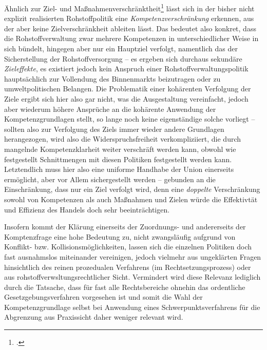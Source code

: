 \documentclass[12pt,a4paper,oneside]{book} %
\begin{document}
	Ähnlich zur \glqq Ziel- und Maßnahmenverschränktheit\grqq \footcite[siehe zu diesem Begriff]{Callies, Berliner Online Beiträge zum Europarecht, Nr 52} lässt sich in der bisher nicht explizit realisierten Rohstoffpolitik eine \textit{Kompetenzverschränkung} erkennen, aus der aber keine Zielverschränkheit ableiten lässt. Das bedeutet also konkret, dass die Rohstoffverwaltung zwar mehrere Kompetenzen in unterschiedlicher Weise in sich bündelt, hingegen aber nur ein Hauptziel verfolgt, namentlich das der Sicherstellung der Rohstoffversorgung -- es ergeben sich durchaus sekundäre \textit{Zieleffekte}, es existiert jedoch kein Anspruch einer Rohstoffverwaltungspolitik hauptsächlich zur Vollendung des Binnenmarkts beizutragen oder zu umweltpolitischen Belangen. Die Problematik einer kohärenten Verfolgung der Ziele ergibt sich hier also gar nicht, was die Ausgestaltung vereinfacht, jedoch aber wiederum höhere Ansprüche an die kohärente Anwendung der Kompetenzgrundlagen stellt, so lange noch keine eigenständige solche vorliegt -- sollten also zur Verfolgung des Ziels immer wieder andere Grundlagen herangezogen, wird also die Widerspruchsfreiheit verkompliziiert, die durch mangelnde Kompetenzklarheit weiter verschräft werden kann, obwohl wie festgestellt Schnittmengen mit diesen Politiken festgestellt werden kann. Letztendlich muss hier also eine uniforme Handhabe der Union einerseits ermöglicht, aber vor Allem sichergestellt werden -- gebunden an die Einschränkung, dass nur ein Ziel verfolgt wird, denn eine \textit{doppelte} Verschränkung sowohl von Kompetenzen als auch Maßnahmen und Zielen würde die Effektivtät und Effizienz des Handels doch sehr beeinträchtigen.
	
	Insofern kommt der Klärung einerseits der Zuordnungs- und andererseits der Komptenzfrage eine hohe Bedeutung zu, nicht zwangsläufig aufgrund von Konflikt- bzw. Kollisionsmöglichkeiten, lassen sich die einzelnen Politiken doch fast ausnahmslos miteinander vereinigen, jedoch vielmehr aus ungeklärten Fragen hinsichtlich des reinen prozedualen Verfahrens (im Rechtsetzungsprozess) oder aus rohstoffverwsltungsrechtlicher Sicht. Vermindert wird diese Relevanz lediglich durch die Tatsache, dass für fast alle Rechtsbereiche ohnehin das ordentliche Gesetzgebungsverfahren vorgesehen ist und somit die Wahl der Kompetenzgrundlage selbst bei Anwendung eines Schwerpunktsverfahrens für die Abgrenzung aus Praxissicht daher weniger relevant wird. 
	
\end{document}
